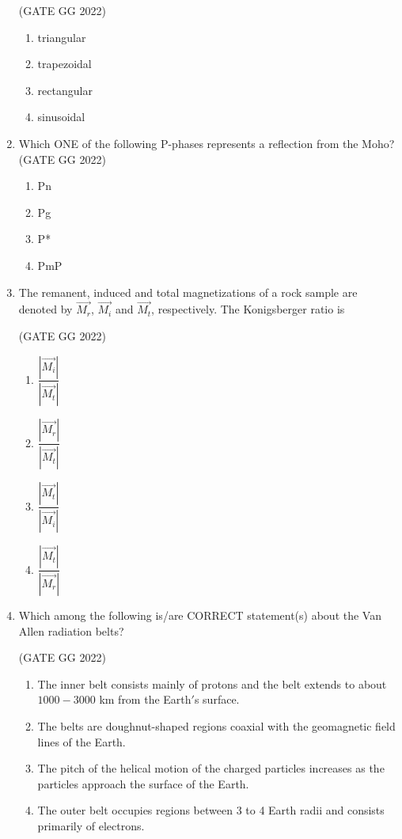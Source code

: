 \documentclass[journal]{IEEEtran}
\begin{document}
\begin{enumerate}
\hfill(GATE GG 2022)
\begin{enumerate}
\item triangular  
\item trapezoidal  
\item rectangular  
\item sinusoidal  
\end{enumerate}


\item Which ONE of the following P-phases represents a reflection from the Moho?  
\hfill(GATE GG 2022)
\begin{enumerate}
\item Pn  
\item Pg  
\item P*  
\item PmP  
\end{enumerate}


\item The remanent, induced and total magnetizations of a rock sample are denoted by $\vec{M_r}$, $\vec{M_i}$ and $\vec{M_t}$, respectively. The Konigsberger ratio is  

\hfill(GATE GG 2022)
\begin{enumerate}
\item $\dfrac{|\vec{M_i}|}{|\vec{M_t}|}$  
\item $\dfrac{|\vec{M_r}|}{|\vec{M_t}|}$  
\item $\dfrac{|\vec{M_t}|}{|\vec{M_i}|}$  
\item $\dfrac{|\vec{M_t}|}{|\vec{M_r}|}$  
\end{enumerate}


\item Which among the following is/are CORRECT statement(s) about the Van Allen radiation belts?  

\hfill(GATE GG 2022)
\begin{enumerate}
\item The inner belt consists mainly of protons and the belt extends to about $1000-3000$ km from the Earth$'$s surface.  
\item The belts are doughnut-shaped regions coaxial with the geomagnetic field lines of the Earth.  
\item The pitch of the helical motion of the charged particles increases as the particles approach the surface of the Earth.  
\item The outer belt occupies regions between 3 to 4 Earth radii and consists primarily of electrons.  
\end{enumerate}



\end{enumerate}
\end{document}
